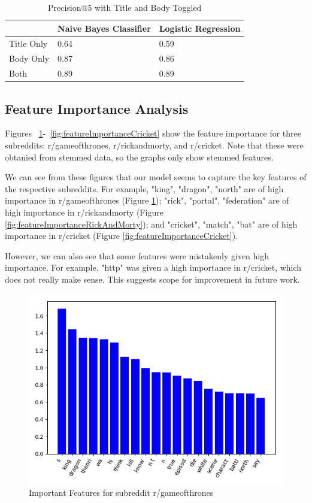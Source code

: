 \documentclass{sig-alternate-05-2015}
\begin{document}
\begin{table}[H]
\begin{tabular}{|l|l|l|}
\hline
           & Naive Bayes Classifier & Logistic Regression \\ \hline
Title Only & 0.64                   & 0.59                \\ \hline
Body Only  & 0.87                   & 0.86                \\ \hline
Both       & 0.89                   & 0.89                \\ \hline
\end{tabular}
\caption{Precision@5 with Title and Body Toggled}
\label{table:titleBodyToggled}
\end{table}

\subsection{Feature Importance Analysis}

Figures ~\ref{fig:featureImportanceGOT}-~\ref{fig:featureImportanceCricket} show the feature importance for three subreddits: r/gameofthrones, r/rickandmorty, and r/cricket. Note that these were obtanied from stemmed data, so the graphs only show stemmed features.

We can see from these figures that our model seems to capture the key features of the respective subreddits. For example, "king", "dragon", "north" are of high importance in r/gameofthrones (Figure \ref{fig:featureImportanceGOT}); "rick", "portal", "federation" are of high importance in r/rickandmorty (Figure \ref{fig:featureImportanceRickAndMorty}); and "cricket", "match", "bat" are of high importance in r/cricket (Figure \ref{fig:featureImportanceCricket}).

However, we can also see that some features were mistakenly given high importance. For example, "http" was given a high importance in r/cricket, which does not really make sense. This suggests scope for improvement in future work.

\begin{figure}[H]
\centering
\includegraphics[width=\linewidth]{plots/coefficients-gameofthrones-dim-337.png}
\caption{Important Features for subreddit r/gameofthrones}
\label{fig:featureImportanceGOT}
\end{figure}
\end{document}
